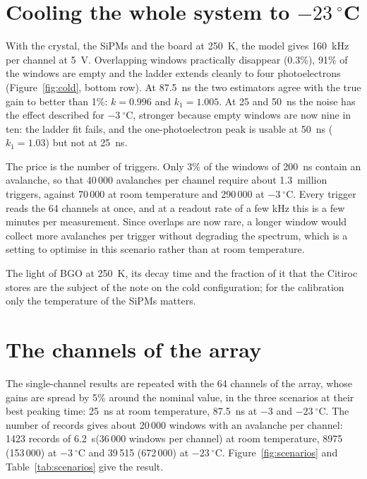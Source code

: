 \documentclass[11pt]{article}
\newcommand{\us}{\textmu s\xspace}
\begin{document}
\section{\texorpdfstring{Cooling the whole system to $-23~^\circ$C}{Cooling the whole system to -23 C}}
\label{sec:cold}

With the crystal, the SiPMs and the board at 250~K, the model gives
160~kHz per channel at 5~V. Overlapping windows practically disappear
(0.3\%), 91\% of the windows are empty and the ladder extends cleanly to
four photoelectrons (Figure~\ref{fig:cold}, bottom row). At 87.5~ns the
two estimators agree with the true gain to better than 1\%: $k = 0.996$
and $k_1 = 1.005$. At 25 and 50~ns the noise has the effect described for
$-3~^\circ$C, stronger because empty windows are now nine in ten: the
ladder fit fails, and the one-photoelectron peak is usable at 50~ns
($k_1 = 1.03$) but not at 25~ns.

The price is the number of triggers. Only 3\% of the windows of 200~ns
contain an avalanche, so that 40\,000 avalanches per channel require about
1.3~million triggers, against 70\,000 at room temperature and 290\,000 at
$-3~^\circ$C. Every trigger reads the 64 channels at once, and at a
readout rate of a few kHz this is a few minutes per measurement. Since
overlaps are now rare, a longer window would collect more avalanches per
trigger without degrading the spectrum, which is a setting to optimise in
this scenario rather than at room temperature.

The light of BGO at 250~K, its decay time and the fraction of it that the
Citiroc stores are the subject of the note on the cold configuration; for
the calibration only the temperature of the SiPMs matters.

\section{The channels of the array}
\label{sec:channels}

The single-channel results are repeated with the 64 channels of the
array, whose gains are spread by 5\% around the nominal value, in the three
scenarios at their best peaking time: 25~ns at room temperature, 87.5~ns at
$-3$ and $-23~^\circ$C. The number of records gives about 20\,000 windows
with an avalanche per channel: 1423 records of 6.2~\us (36\,000 windows
per channel) at room temperature, 8975 (153\,000) at $-3~^\circ$C and
39\,515 (672\,000) at $-23~^\circ$C. Figure~\ref{fig:scenarios} and
Table~\ref{tab:scenarios} give the result.
\end{document}
